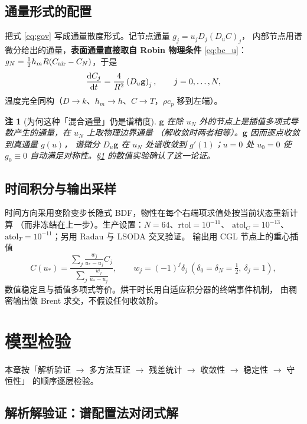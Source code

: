 \documentclass[withoutpreface,bwprint]{cumcmthesis}
\newtheorem{remark}{注}
\begin{document}
\subsection{通量形式的配置}

把式 \eqref{eq:gov} 写成通量散度形式。记节点通量 $g_j=u_jD_j(D_uC)_j$，
内部节点用谱微分给出的通量，\textbf{表面通量直接取自 Robin 物理条件} \eqref{eq:bc_u}：
$g_N=\frac12h_mR(C_{\rm air}-C_N)$，于是
\begin{equation}
\frac{{\rm d}C_j}{{\rm d}t}=\frac{4}{R^2}\left(D_u\mathbf{g}\right)_j,\qquad j=0,\dots,N,
\end{equation}
温度完全同构（$D\to k$、$h_m\to h$、$C\to T$，$\rho c_p$ 移到左端）。

\begin{remark}[为何这种「混合通量」仍是谱精度]
$\mathbf g$ 在除 $u_N$ 外的节点上是插值多项式导数产生的通量，在 $u_N$ 上取物理边界通量
（解收敛时两者相等）。$\mathbf g$ 因而逐点收敛到真通量 $g(u)$，
谱微分 $D_u\mathbf g$ 在 $u_N$ 处谱收敛到 $g'(1)$；$u=0$ 处 $u_0=0$ 使 $g_0\equiv0$
自动满足对称性。\S\ref{sec:verify} 的数值实验确认了这一论证。
\end{remark}

\subsection{时间积分与输出采样}

时间方向采用变阶变步长隐式 BDF，物性在每个右端项求值处按当前状态重新计算
（而非冻结在上一步）。生产设置：$N=64$、$\mathrm{rtol}=10^{-11}$、
$\mathrm{atol}_C=10^{-13}$、$\mathrm{atol}_T=10^{-11}$；另用 Radau 与 LSODA 交叉验证。
输出用 CGL 节点上的重心插值
\[
C(u_*)=\frac{\sum_j\frac{w_j}{u_*-u_j}C_j}{\sum_j\frac{w_j}{u_*-u_j}},
\qquad w_j=(-1)^j\delta_j\ (\delta_0=\delta_N=\tfrac12,\ \delta_j=1),
\]
数值稳定且与插值多项式等价。烘干时长用自适应积分器的终端事件机制，
由稠密输出做 Brent 求交，不假设任何收敛阶。

\section{模型检验}
\label{sec:verify}

本章按「解析验证 $\to$ 多方法互证 $\to$ 残差统计 $\to$ 收敛性 $\to$ 稳定性 $\to$ 守恒性」
的顺序逐层检验。

\subsection{解析解验证：谱配置法对闭式解}
\end{document}
